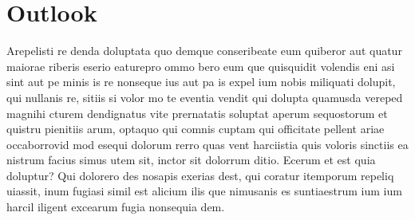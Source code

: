 \section{Outlook}
\label{sec:Outlook}
Arepelisti re denda doluptata quo demque conseribeate eum quiberor aut quatur maiorae riberis eserio eaturepro ommo bero eum que quisquidit volendis eni asi sint aut pe minis is re nonseque ius aut pa is expel ium nobis miliquati dolupit, qui nullanis re, sitiis si volor mo te eventia vendit qui dolupta quamusda vereped magnihi cturem dendignatus vite prernatatis soluptat aperum sequostorum et quistru pienitiis arum, optaquo qui comnis cuptam qui officitate pellent ariae occaborrovid mod esequi dolorum rerro quas vent harciistia quis voloris sinctiis ea nistrum facius simus utem sit, inctor sit dolorrum ditio. Ecerum et est quia doluptur? Qui dolorero des nosapis exerias dest, qui coratur itemporum repeliq uiassit, inum fugiasi simil est alicium ilis que nimusanis es suntiaestrum ium ium harcil iligent excearum fugia nonsequia dem.

